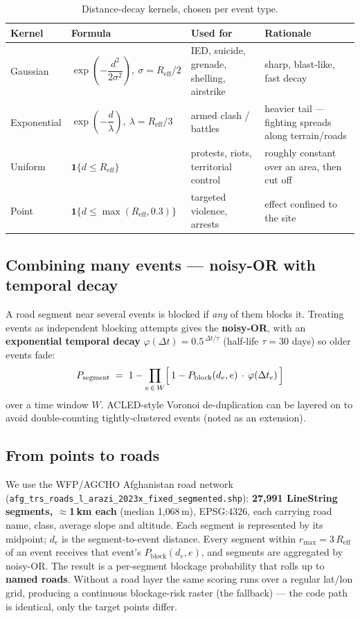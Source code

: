 \documentclass[11pt,a4paper]{article}
\newcommand{\code}[1]{\texttt{\small #1}}
\newcommand{\Reff}{R_{\mathrm{eff}}}
\newcommand{\Pblock}{P_{\mathrm{block}}}
\begin{document}
\begin{table}[h]
\centering
\renewcommand{\arraystretch}{1.35}
\begin{tabularx}{\textwidth}{@{}l l l X@{}}
\toprule
\textbf{Kernel} & \textbf{Formula} & \textbf{Used for} & \textbf{Rationale} \\
\midrule
Gaussian & $\exp\!\left(-\dfrac{d^2}{2\sigma^2}\right),\ \sigma=\Reff/2$
  & IED, suicide, grenade, shelling, airstrike & sharp, blast-like, fast decay \\
Exponential & $\exp\!\left(-\dfrac{d}{\lambda}\right),\ \lambda=\Reff/3$
  & armed clash / battles & heavier tail --- fighting spreads along terrain/roads \\
Uniform & $\mathbf{1}\{d\le \Reff\}$
  & protests, riots, territorial control & roughly constant over an area, then cut off \\
Point & $\mathbf{1}\{d\le \max(\Reff,0.3)\}$
  & targeted violence, arrests & effect confined to the site \\
\bottomrule
\end{tabularx}
\caption{Distance-decay kernels, chosen per event type.}
\label{tab:kernels}
\end{table}

\subsection{Combining many events --- noisy-OR with temporal decay}

A road segment near several events is blocked if \emph{any} of them blocks it. Treating events
as independent blocking attempts gives the \textbf{noisy-OR}, with an \textbf{exponential
temporal decay} $\varphi(\Delta t)=0.5^{\,\Delta t/\tau}$ (half-life $\tau=30$ days) so older
events fade:
\begin{equation}
P_{\text{segment}} \;=\; 1 - \prod_{e\,\in\,W}\Bigl[\,1 - \Pblock(d_e,e)\,\cdot\,\varphi(\Delta t_e)\,\Bigr]
\label{eq:noisyor}
\end{equation}
over a time window $W$. ACLED-style Voronoi de-duplication can be layered on to avoid
double-counting tightly-clustered events (noted as an extension).

\subsection{From points to roads}

We use the WFP/AGCHO Afghanistan road network
(\code{afg\_trs\_roads\_l\_arazi\_2023x\_fixed\_segmented.shp}): \textbf{27{,}991 LineString
segments, $\approx$1\,km each} (median 1{,}068\,m), EPSG:4326, each carrying road name, class,
average slope and altitude. Each segment is represented by its midpoint; $d_e$ is the
segment-to-event distance. Every segment within $r_{\max}=3\,\Reff$ of an event receives that
event's $\Pblock(d_e,e)$, and segments are aggregated by noisy-OR. The result is a per-segment
blockage probability that rolls up to \textbf{named roads}. Without a road layer the same
scoring runs over a regular lat/lon grid, producing a continuous blockage-risk raster (the
fallback) --- the code path is identical, only the target points differ.
\end{document}
